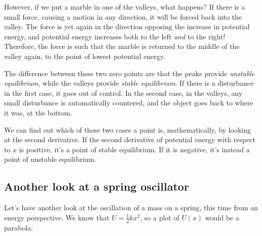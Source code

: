 However, if we put a marble in one of the valleys, what happens? If there is a small force, causing a motion in any direction, it will be forced back into the valley. The force is yet again in the direction opposing the increase in potential energy, and potential energy increases both to the left \emph{and} to the right! Therefore, the force is such that the marble is returned to the middle of the valley again, to the point of lowest potential energy.

The difference between these two zero points are that the peaks provide \emph{unstable equilibrium}, while the valleys provide \emph{stable equilibrium}. If there is a disturbance in the first case, it goes out of control. In the second case, in the valleys, any small disturbance is automatically countered, and the object goes back to where it was, at the bottom.

We can find out which of these two cases a point is, mathematically, by looking at the second derivative. If the second derivative of potential energy with respect to $x$ is positive, it's a point of stable equilibrium. If it is negative, it's instead a point of unstable equilibrium.

\subsection{Another look at a spring oscillator}

Let's have another look at the oscillation of a mass on a spring, this time from an energy perspective. We know that $\displaystyle U = \frac{1}{2} k x^2$, so a plot of $U(x)$ would be a parabola:

\begin{figure}[H]
  \centering
{}
\caption{}
\end{figure}


